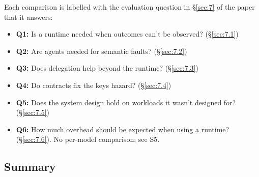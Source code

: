 \documentclass[letterpaper,twocolumn,10pt]{article}
\begin{document}
Each comparison is labelled with the evaluation question in \S\ref{sec:7} of the paper that it answers:

\begin{itemize}
\item \textbf{Q1:} Is a runtime needed when outcomes can't be observed? (\S\ref{sec:7.1})
\item \textbf{Q2:} Are agents needed for semantic faults? (\S\ref{sec:7.2})
\item \textbf{Q3:} Does delegation help beyond the runtime? (\S\ref{sec:7.3})
\item \textbf{Q4:} Do contracts fix the keys hazard? (\S\ref{sec:7.4})
\item \textbf{Q5:} Does the system design hold on workloads it wasn't designed for? (\S\ref{sec:7.5})
\item \textbf{Q6:} How much overhead should be expected when using a runtime? (\S\ref{sec:7.6}). No per-model comparison; see S5.
\end{itemize}

\subsection*{Summary}
\end{document}
